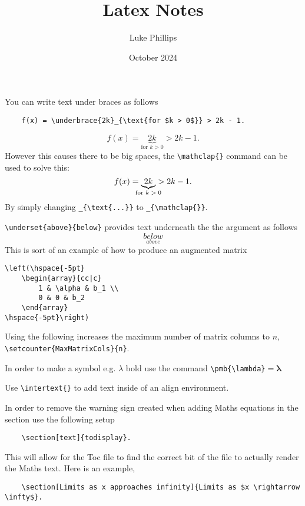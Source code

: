 \documentclass[10pt, a4paper]{article}
\title{Latex Notes}
\author{Luke Phillips}
\date{October 2024}
\begin{document}
\maketitle

\newpage

You can write text under braces as follows
\begin{verbatim}
    f(x) = \underbrace{2k}_{\text{for $k > 0$}} > 2k - 1.
\end{verbatim}
\[
f(x) = \underbrace{2k}_{\text{for $k > 0$}} > 2k - 1.
\]
However this causes there to be big spaces,
the \verb|\mathclap{}| command can be used to solve this:
\[
f(x) = \underbrace{2k}_{\mathclap{\text{for $k > 0$}}} > 2k - 1.
\]
By simply changing \verb|_{\text{...}}| to \verb|_{\mathclap{}}|.

\verb|\underset{above}{below}| provides text underneath the the argument as follows
\[
\underset{above}{below}
\]
This is sort of an example of how to produce an augmented matrix
\begin{verbatim}
\left(\hspace{-5pt}
    \begin{array}{cc|c}
        1 & \alpha & b_1 \\
        0 & 0 & b_2
    \end{array}
\hspace{-5pt}\right)
\end{verbatim}

Using the following increases the maximum number of matrix columns to $n$,
\verb|\setcounter{MaxMatrixCols}{n}|.

In order to make a symbol e.g. $\lambda$ bold use the command \verb|\pmb{\lambda}|$ = \pmb{\lambda}$

Use \verb|\intertext{}| to add text inside of an align environment.

In order to remove the warning sign created when adding Maths equations in the section use the following setup
\begin{verbatim}
    \section[text]{todisplay}.
\end{verbatim}
This will allow for the Toc file to find the correct bit of the file to actually render the Maths text.
Here is an example,
\begin{verbatim}
    \section[Limits as x approaches infinity]{Limits as $x \rightarrow \infty$}.
\end{verbatim}
\end{document}
